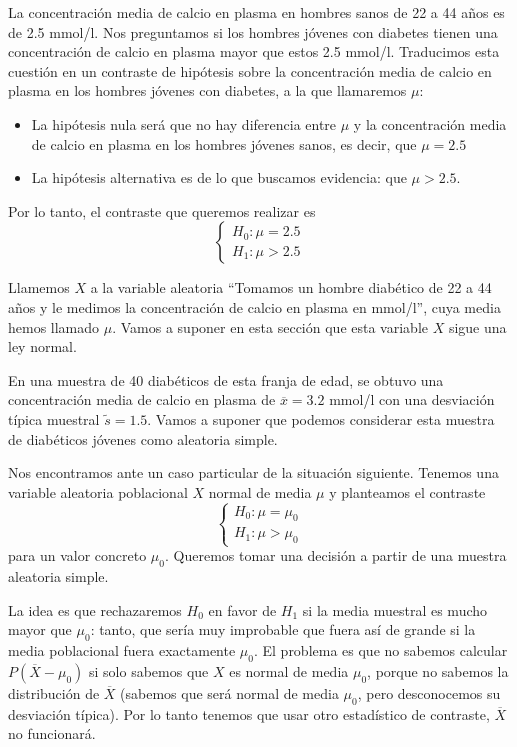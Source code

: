 \documentclass[
  spanish,
  letterpaper,
  DIV=11,
  numbers=noendperiod]{scrreprt}
\begin{document}
La concentración media de calcio en plasma en hombres sanos de 22 a 44
años es de 2.5 mmol/l. Nos preguntamos si los hombres jóvenes con
diabetes tienen una concentración de calcio en plasma mayor que estos
2.5 mmol/l. Traducimos esta cuestión en un contraste de hipótesis sobre
la concentración media de calcio en plasma en los hombres jóvenes con
diabetes, a la que llamaremos \(\mu\):

\begin{itemize}
\item
  La hipótesis nula será que no hay diferencia entre \(\mu\) y la
  concentración media de calcio en plasma en los hombres jóvenes sanos,
  es decir, que \(\mu=2.5\)
\item
  La hipótesis alternativa es de lo que buscamos evidencia: que
  \(\mu>2.5\).
\end{itemize}

Por lo tanto, el contraste que queremos realizar es \[
\left\{\begin{array}{l}
H_{0}:\mu=2.5\\ 
H_{1}:\mu >2.5
\end{array}
\right.
\]

Llamemos \(X\) a la variable aleatoria ``Tomamos un hombre diabético de
22 a 44 años y le medimos la concentración de calcio en plasma en
mmol/l'', cuya media hemos llamado \(\mu\). Vamos a suponer en esta
sección que esta variable \(X\) sigue una ley normal.

En una muestra de 40 diabéticos de esta franja de edad, se obtuvo una
concentración media de calcio en plasma de \(\overline{x}=3.2\) mmol/l
con una desviación típica muestral \(\widetilde{s}=1.5\). Vamos a
suponer que podemos considerar esta muestra de diabéticos jóvenes como
aleatoria simple.

Nos encontramos ante un caso particular de la situación siguiente.
Tenemos una variable aleatoria poblacional \(X\) normal de media \(\mu\)
y planteamos el contraste \[
\left\{\begin{array}{l}
H_{0}:\mu=\mu_0\\ 
H_{1}:\mu >\mu_0
\end{array}
\right.
\] para un valor concreto \(\mu_0\). Queremos tomar una decisión a
partir de una muestra aleatoria simple.

La idea es que rechazaremos \(H_0\) en favor de \(H_1\) si la media
muestral es mucho mayor que \(\mu_0\): tanto, que sería muy improbable
que fuera así de grande si la media poblacional fuera exactamente
\(\mu_0\). El problema es que no sabemos calcular
\(P(\overline{X}-\mu_0)\) si solo sabemos que \(X\) es normal de media
\(\mu_0\), porque no sabemos la distribución de \(\overline{X}\)
(sabemos que será normal de media \(\mu_0\), pero desconocemos su
desviación típica). Por lo tanto tenemos que usar otro estadístico de
contraste, \(\overline{X}\) no funcionará.
\end{document}
